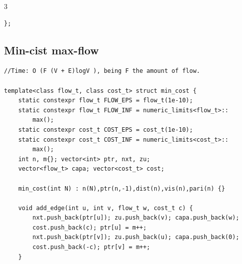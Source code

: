\documentclass[9pt, a4paper, notitlepage]{extreport}
\begin{document}
\begin{multicols}{3}
\begin{verbatim}
};
\end{verbatim}

\subsection{Min-cist max-flow}
\begin{verbatim}
//Time: O (F (V + E)logV ), being F the amount of flow.

template<class flow_t, class cost_t> struct min_cost {
    static constexpr flow_t FLOW_EPS = flow_t(1e-10);
    static constexpr flow_t FLOW_INF = numeric_limits<flow_t>::
        max();
    static constexpr cost_t COST_EPS = cost_t(1e-10);
    static constexpr cost_t COST_INF = numeric_limits<cost_t>::
        max();
    int n, m{}; vector<int> ptr, nxt, zu;
    vector<flow_t> capa; vector<cost_t> cost;

    min_cost(int N) : n(N),ptr(n,-1),dist(n),vis(n),pari(n) {}

    void add_edge(int u, int v, flow_t w, cost_t c) {
        nxt.push_back(ptr[u]); zu.push_back(v); capa.push_back(w);
        cost.push_back(c); ptr[u] = m++;
        nxt.push_back(ptr[v]); zu.push_back(u); capa.push_back(0);
        cost.push_back(-c); ptr[v] = m++;
    }


\end{verbatim}
\end{multicols}
\end{document}
